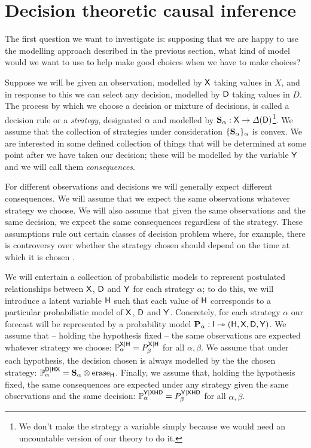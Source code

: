 
\section{Decision theoretic causal inference}\label{sec:seedo_models}

The first question we want to investigate is: supposing that we are happy to use the modelling approach described in the previous section, what kind of model would we want to use to help make good choices when we have to make choices?

Suppose we will be given an observation, modelled by $\mathsf{X}$ taking values in $X$, and in response to this we can select any decision, modelled by $\mathsf{D}$ taking values in $D$. The process by which we choose a decision or mixture of decisions, is called a decision rule or a \emph{strategy}, designated $\alpha$ and modelled by $\mathbf{S}_\alpha:\mathsf{X}\to \Delta(\mathsf{D})$\footnote{We don't make the strategy a variable simply because we would need an uncountable version of our theory to do it.}. We assume that the collection of strategies under consideration $\{\mathbf{S}_\alpha\}_\alpha$ is convex. We are interested in some defined collection of things that will be determined at some point after we have taken our decision; these will be modelled by the variable $\mathsf{Y}$ and we will call them \emph{consequences}.

For different observations and decisions we will generally expect different consequences. We will assume that we expect the same observations whatever strategy we choose. We will also assume that given the same observations and the same decision, we expect the same consequences regardless of the strategy. These assumptions rule out certain classes of decision problem where, for example, there is controversy over whether the strategy chosen should depend on the time at which it is chosen \citet{weirich_causal_2016,lewis_causal_1981,paul_f_christiano_edt_2018}.

We will entertain a collection of probabilistic models to represent postulated relationships between $\mathsf{X}$, $\mathsf{D}$ and $\mathsf{Y}$ for each strategy $\alpha$; to do this, we will introduce a latent variable $\mathsf{H}$ such that each value of $\mathsf{H}$ corresponds to a particular probabilistic model of $\mathsf{X}$, $\mathsf{D}$ and $\mathsf{Y}$. Concretely, for each strategy $\alpha$ our forecast will be represented by a probability model $\mathbf{P}_{\alpha}:\mathsf{I}\rightarrowtriangle (\mathsf{H},\mathsf{X},\mathsf{D},\mathsf{Y})$. We assume that -- holding the hypothesis fixed -- the same observations are expected whatever strategy we choose: $\mathbb{P}_{\alpha}^{\mathsf{X}|\mathsf{H}}=P_{\beta}^{\mathsf{X}|\mathsf{H}}$ for all $\alpha,\beta$. We assume that under each hypothesis, the decision chosen is always modelled by the the chosen strategy: $\mathbb{P}_{\alpha}^{\mathsf{D}|\mathsf{HX}}=\mathbf{S}_\alpha \otimes \text{erase}_{\mathsf{H}}$. Finally, we assume that, holding the hypothesis fixed, the same consequences are expected under any strategy given the same observations and the same decision: $\mathbb{P}_{\alpha}^{\mathsf{Y}|\mathsf{XHD}}=P_{\beta}^{\mathsf{Y}|\mathsf{XHD}}$ for all $\alpha,\beta$.

